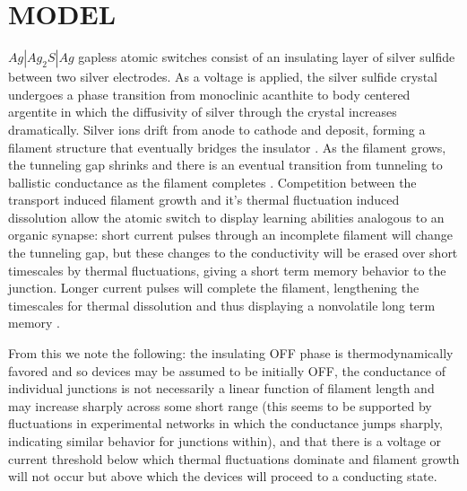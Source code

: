 \documentclass[aps,prl,reprint,groupedaddress]{revtex4-1}
\begin{document}
\section{MODEL}

$Ag | Ag_2 S | Ag$ gapless atomic switches consist of an insulating layer
of silver sulfide between two silver electrodes.  As a voltage is
applied, the silver sulfide crystal undergoes a phase transition from
monoclinic acanthite to body centered argentite in which the diffusivity of
silver through the crystal increases dramatically.  Silver ions drift
from anode to cathode and deposit, forming a filament structure that eventually
bridges the insulator \cite{Xu2010}. As the filament grows, the
tunneling gap shrinks and there is an eventual transition from tunneling
to ballistic conductance as the filament completes
\cite{Hasegawa2010, Sun2014}. Competition between the transport induced
filament growth and it's thermal fluctuation induced dissolution allow the
atomic switch to display learning abilities analogous to an organic synapse:
short current pulses through an incomplete filament will change the tunneling
gap, but these changes to the conductivity will be erased over short timescales
by thermal fluctuations, giving a short term memory behavior to the junction.
Longer current pulses will complete the filament, lengthening the timescales
for thermal dissolution and thus displaying a nonvolatile long term memory
\cite{Hasegawa2010, Ohno2011}.

From this we note the following: the insulating OFF phase is
thermodynamically favored
and so devices may be assumed to be initially OFF, the conductance of
individual junctions is not necessarily a linear function of filament length
and may increase sharply across some short range (this seems to be supported
by fluctuations in experimental networks in which the conductance jumps
sharply, indicating similar behavior for junctions within), and that
there is a voltage or current threshold below which thermal fluctuations
dominate and filament
growth will not occur but above which the devices will proceed to a
conducting state.
\end{document}
